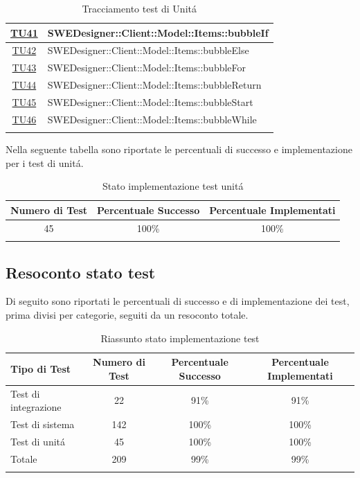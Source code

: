 \documentclass[../PianoDiQualifica.tex]{subfiles}
\begin{document}
\begin{longtable}{|c|l|}
			\hline
			\hyperlink{TU41}{TU41} &SWEDesigner::Client::Model::Items::bubbleIf \\
			\hline
			\hyperlink{TU42}{TU42} &SWEDesigner::Client::Model::Items::bubbleElse \\
			\hline
			\hyperlink{TU43}{TU43} & SWEDesigner::Client::Model::Items::bubbleFor\\
			\hline
			\hyperlink{TU44}{TU44} &SWEDesigner::Client::Model::Items::bubbleReturn \\
			\hline
			\hyperlink{TU45}{TU45} &SWEDesigner::Client::Model::Items::bubbleStart \\
			\hline
			\hyperlink{TU46}{TU46} &SWEDesigner::Client::Model::Items::bubbleWhile \\
			\hline
			\caption[Tracciamento test di Unit\'a]{Tracciamento test di Unit\'a}
			\label{tabella:TracciamentoTestUnit\'a}
		\end{longtable}
		Nella seguente tabella sono riportate le percentuali di successo e implementazione per i test di unit\'a.
			\normalsize
			\begin{longtable}{|c|c|c|}
				\hline
				\textbf{Numero di Test} & \textbf{Percentuale Successo} & \textbf{Percentuale Implementati}\\
				\hline
				\endhead
				45 &100\% &100\%\\
				\hline
				\caption[Stato implementazione test unit\'a]{Stato implementazione test unit\'a}
				\label{tabella:Stato implementazione test unit\'a}
			\end{longtable}
			
		\subsection{Resoconto stato test}
		Di seguito sono riportati le percentuali di successo e di implementazione dei test, prima divisi per categorie, seguiti da un resoconto totale.%
		
		\normalsize
		\begin{longtable}{|l|c|c|c|}
			\hline
			\textbf{Tipo di Test}&\textbf{Numero di Test} & \textbf{Percentuale Successo} & \textbf{Percentuale Implementati}\\
			\hline
			\endhead
			Test di integrazione & 22 & 91\% & 91\%\\
			\hline
			Test di sistema & 142& 100\% &100\%\\
			\hline
			Test di unit\'a & 45 &100\% &100\%\\
			\hline
			Totale &209 &99\% &99\%\\
			\hline
			\caption[Riassunto stato implementazione test ]{Riassunto stato implementazione test }
			\label{tabella:Riassunto stato implementazione Test }
		\end{longtable}
\end{document}
